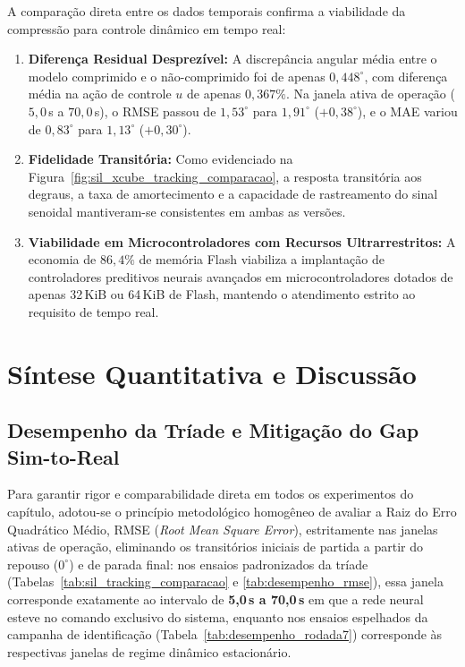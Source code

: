 A comparação direta entre os dados temporais confirma a viabilidade da compressão para controle dinâmico em tempo real:
\begin{enumerate}
    \item \textbf{Diferença Residual Desprezível:} A discrepância angular média entre o modelo comprimido e o não-comprimido foi de apenas ${0{,}448^\circ}$, com diferença média na ação de controle $u$ de apenas ${0{,}367\%}$. Na janela ativa de operação ($5{,}0$\,s a $70{,}0$\,s), o RMSE passou de $1{,}53^\circ$ para $1{,}91^\circ$ ($+0{,}38^\circ$), e o MAE variou de $0{,}83^\circ$ para $1{,}13^\circ$ ($+0{,}30^\circ$).
    \item \textbf{Fidelidade Transitória:} Como evidenciado na Figura~\ref{fig:sil_xcube_tracking_comparacao}, a resposta transitória aos degraus, a taxa de amortecimento e a capacidade de rastreamento do sinal senoidal mantiveram-se consistentes em ambas as versões.
    \item \textbf{Viabilidade em Microcontroladores com Recursos Ultrarrestritos:} A economia de $86{,}4\%$ de memória Flash viabiliza a implantação de controladores preditivos neurais avançados em microcontroladores dotados de apenas 32\,KiB ou 64\,KiB de Flash, mantendo o atendimento estrito ao requisito de tempo real.
\end{enumerate}

\section{Síntese Quantitativa e Discussão}
\label{sec:res_discussao}

\subsection{Desempenho da Tríade e Mitigação do Gap Sim-to-Real}

Para garantir rigor e comparabilidade direta em todos os experimentos do capítulo, adotou-se o princípio metodológico homogêneo de avaliar a Raiz do Erro Quadrático Médio, RMSE (\textit{Root Mean Square Error}), estritamente nas janelas ativas de operação, eliminando os transitórios iniciais de partida a partir do repouso ($0^\circ$) e de parada final: nos ensaios padronizados da tríade (Tabelas~\ref{tab:sil_tracking_comparacao} e \ref{tab:desempenho_rmse}), essa janela corresponde exatamente ao intervalo de \textbf{5,0\,s a 70,0\,s} em que a rede neural esteve no comando exclusivo do sistema, enquanto nos ensaios espelhados da campanha de identificação (Tabela~\ref{tab:desempenho_rodada7}) corresponde às respectivas janelas de regime dinâmico estacionário.

